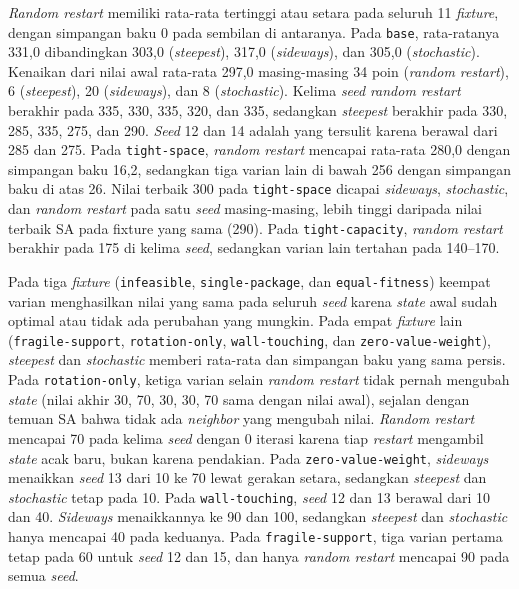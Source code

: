 \textit{Random restart} memiliki rata-rata tertinggi atau setara pada seluruh 11 \textit{fixture}, dengan simpangan baku 0 pada sembilan di antaranya. Pada \texttt{base}, rata-ratanya 331,0 dibandingkan 303,0 (\textit{steepest}), 317,0 (\textit{sideways}), dan 305,0 (\textit{stochastic}). Kenaikan dari nilai awal rata-rata 297,0 masing-masing 34 poin (\textit{random restart}), 6 (\textit{steepest}), 20 (\textit{sideways}), dan 8 (\textit{stochastic}). Kelima \textit{seed} \textit{random restart} berakhir pada 335, 330, 335, 320, dan 335, sedangkan \textit{steepest} berakhir pada 330, 285, 335, 275, dan 290. \textit{Seed} 12 dan 14 adalah yang tersulit karena berawal dari 285 dan 275. Pada \texttt{tight-space}, \textit{random restart} mencapai rata-rata 280,0 dengan simpangan baku 16,2, sedangkan tiga varian lain di bawah 256 dengan simpangan baku di atas 26. Nilai terbaik 300 pada \texttt{tight-space} dicapai \textit{sideways}, \textit{stochastic}, dan \textit{random restart} pada satu \textit{seed} masing-masing, lebih tinggi daripada nilai terbaik SA pada fixture yang sama (290). Pada \texttt{tight-capacity}, \textit{random restart} berakhir pada 175 di kelima \textit{seed}, sedangkan varian lain tertahan pada 140--170.

Pada tiga \textit{fixture} (\texttt{infeasible}, \texttt{single-package}, dan \texttt{equal-fitness}) keempat varian menghasilkan nilai yang sama pada seluruh \textit{seed} karena \textit{state} awal sudah optimal atau tidak ada perubahan yang mungkin. Pada empat \textit{fixture} lain (\texttt{fragile-support}, \texttt{rotation-only}, \texttt{wall-touching}, dan \texttt{zero-value-weight}), \textit{steepest} dan \textit{stochastic} memberi rata-rata dan simpangan baku yang sama persis. Pada \texttt{rotation-only}, ketiga varian selain \textit{random restart} tidak pernah mengubah \textit{state} (nilai akhir 30, 70, 30, 30, 70 sama dengan nilai awal), sejalan dengan temuan SA bahwa tidak ada \textit{neighbor} yang mengubah nilai. \textit{Random restart} mencapai 70 pada kelima \textit{seed} dengan 0 iterasi karena tiap \textit{restart} mengambil \textit{state} acak baru, bukan karena pendakian. Pada \texttt{zero-value-weight}, \textit{sideways} menaikkan \textit{seed} 13 dari 10 ke 70 lewat gerakan setara, sedangkan \textit{steepest} dan \textit{stochastic} tetap pada 10. Pada \texttt{wall-touching}, \textit{seed} 12 dan 13 berawal dari 10 dan 40. \textit{Sideways} menaikkannya ke 90 dan 100, sedangkan \textit{steepest} dan \textit{stochastic} hanya mencapai 40 pada keduanya. Pada \texttt{fragile-support}, tiga varian pertama tetap pada 60 untuk \textit{seed} 12 dan 15, dan hanya \textit{random restart} mencapai 90 pada semua \textit{seed}.

